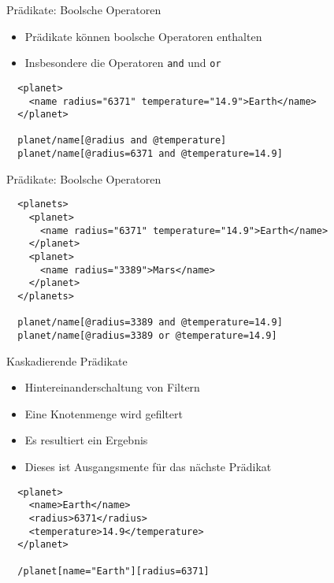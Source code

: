 \documentclass{beamer}
\begin{document}
\begin{frame}[fragile]{Prädikate: Boolsche Operatoren}
	
	\begin{itemize}
		\item Prädikate können boolsche Operatoren enthalten
		\item Insbesondere die Operatoren \texttt{and} und \texttt{or}
	\end{itemize}
	
	\lstset{language=XML}
	\begin{lstlisting}
  <planet>
    <name radius="6371" temperature="14.9">Earth</name>
  </planet>
		
  planet/name[@radius and @temperature]
  planet/name[@radius=6371 and @temperature=14.9]
		\end{lstlisting}
	
\end{frame}

\begin{frame}[fragile]{Prädikate: Boolsche Operatoren}
	
	\lstset{language=XML}
	\begin{lstlisting}
  <planets>
    <planet>
      <name radius="6371" temperature="14.9">Earth</name>
    </planet>
    <planet>
      <name radius="3389">Mars</name>
    </planet>
  </planets>
	
  planet/name[@radius=3389 and @temperature=14.9]
  planet/name[@radius=3389 or @temperature=14.9]
	\end{lstlisting}
	
\end{frame}

\begin{frame}[fragile]{Kaskadierende Prädikate}
	
	\begin{itemize}
		\item Hintereinanderschaltung von Filtern
		\item Eine Knotenmenge wird gefiltert
		\item Es resultiert ein Ergebnis
		\item Dieses ist Ausgangsmente für das nächste Prädikat
	\end{itemize}
	
	\lstset{language=XML}
	\begin{lstlisting}
  <planet>
    <name>Earth</name>
    <radius>6371</radius>
    <temperature>14.9</temperature>
  </planet>
	
  /planet[name="Earth"][radius=6371]
	\end{lstlisting}

\end{frame}
	
\end{document}
